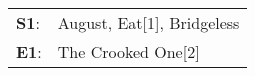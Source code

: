 \begin{supertabular}{p{0.03\textwidth}p{0.92\textwidth}}
 \textbf{S1}:  &  August\textsuperscript{}, \enspace Eat[1]\textsuperscript{}, \enspace Bridgeless\textsuperscript{}  \enspace  \\
 \textbf{E1}:  &                                                                The Crooked One[2]\textsuperscript{}  \enspace  \\
\end{supertabular}
